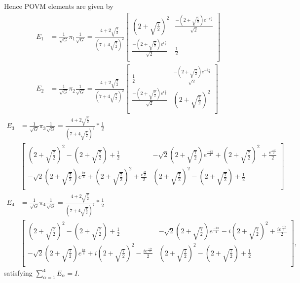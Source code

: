 Hence POVM elements are given by
{\fontsize{8pt}{10pt}\selectfont
\begin{align*}
E_{1} & = \frac{1}{\sqrt{G}}\pi_{1}\frac{1}{\sqrt{G}} = \frac{4+2\sqrt{\frac{7}{2}}}{\left(7+4\sqrt{\frac{7}{2}}\right)^2}
\begin{bmatrix}
\left(2+\sqrt{\frac{7}{2}}\right)^2 & \frac{-\left(2+\sqrt{\frac{7}{2}}\right)e^{-i\frac{\pi}{4}}}{\sqrt{2}}  \\ 
\frac{-\left(2+\sqrt{\frac{7}{2}}\right)e^{i\frac{\pi}{4}}}{\sqrt{2}} & \frac{1}{2}\\ 
\end{bmatrix}\\
E_{2} & = \frac{1}{\sqrt{G}}\pi_{2}\frac{1}{\sqrt{G}} = \frac{4+2\sqrt{\frac{7}{2}}}{\left(7+4\sqrt{\frac{7}{2}}\right)^2}
\begin{bmatrix}
\frac{1}{2} & \frac{-\left(2+\sqrt{\frac{7}{2}}\right)e^{-i\frac{\pi}{4}}}{\sqrt{2}}\\ 
\frac{-\left(2+\sqrt{\frac{7}{2}}\right)e^{i\frac{\pi}{4}}}{\sqrt{2}} & \left(2+\sqrt{\frac{7}{2}}\right)^2\\ 
\end{bmatrix}
\end{align*}}
{\fontsize{7.7pt}{10pt}\selectfont
\begin{align*}
E_{3} & = \frac{1}{\sqrt{G}}\pi_{3}\frac{1}{\sqrt{G}} = \frac{4+2\sqrt{\frac{7}{2}}}{\left(7+4\sqrt{\frac{7}{2}}\right)^2}*\frac{1}{2}\\
&\begin{bmatrix}
\left(2+\sqrt{\frac{7}{2}}\right)^2-\left(2+\sqrt{\frac{7}{2}}\right)+\frac{1}{2} & -\sqrt{2}\left(2+\sqrt{\frac{7}{2}}\right)e^{\frac{-i\pi}{4}}+\left(2+\sqrt{\frac{7}{2}}\right)^2+\frac{e^{\frac{-i\pi}{2}}}{2} \\
-\sqrt{2}\left(2+\sqrt{\frac{7}{2}}\right)e^{\frac{i\pi}{4}}+\left(2+\sqrt{\frac{7}{2}}\right)^{2}+\frac{e^{\frac{i\pi}{2}}}{2} & \left(2+\sqrt{\frac{7}{2}}\right)^2-\left(2+\sqrt{\frac{7}{2}}\right)+\frac{1}{2}\\
\end{bmatrix}\\
E_{4} & = \frac{1}{\sqrt{G}}\pi_{4}\frac{1}{\sqrt{G}} = \frac{4+2\sqrt{\frac{7}{2}}}{\left(7+4\sqrt{\frac{7}{2}}\right)^2}*\frac{1}{2}\\
&\begin{bmatrix}
\left(2+\sqrt{\frac{7}{2}}\right)^2-\left(2+\sqrt{\frac{7}{2}}\right)+\frac{1}{2} & -\sqrt{2}\left(2+\sqrt{\frac{7}{2}}\right)e^{\frac{-i\pi}{4}}-i\left(2+\sqrt{\frac{7}{2}}\right)^2+\frac{ie^{\frac{-i\pi}{2}}}{2} \\ 
-\sqrt{2}\left(2+\sqrt{\frac{7}{2}}\right)e^{\frac{i\pi}{4}}+i\left(2+\sqrt{\frac{7}{2}}\right)^2-\frac{ie^{\frac{-i\pi}{2}}}{2} & \left(2+\sqrt{\frac{7}{2}}\right)^2-\left(2+\sqrt{\frac{7}{2}}\right)+\frac{1}{2}\\
\end{bmatrix},
\end{align*}}\relax
satisfying $\sum_{\alpha=1}^{4} E_{\alpha}= I$.

